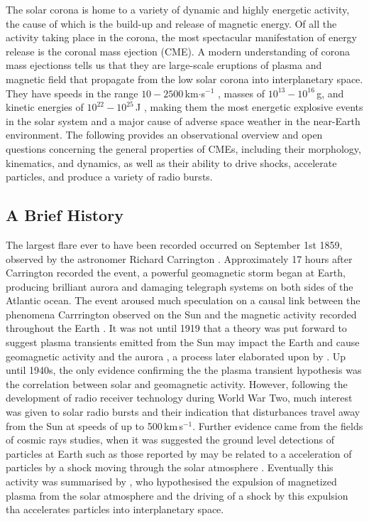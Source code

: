 The solar corona is home to a variety of dynamic and highly energetic activity, the cause of which is the build-up and release of magnetic energy. Of all the activity taking place in the corona, the most spectacular manifestation of energy release is the coronal mass ejection (CME). A modern understanding of corona mass ejectionss tells us that they are large-scale eruptions of plasma and magnetic field that propagate from the low solar corona into interplanetary space. They have speeds in the range $10-2500$\,km$\cdot$s$^{-1}$ \citep{gopal2004}, masses of $10^{13}-10^{16}$\,g, and kinetic energies of $10^{22} - 10^{25}$\,J \citep{vour2010}, making them the most energetic explosive events in the solar system and a major cause of adverse space weather in the near-Earth environment. The following provides an observational overview and open questions concerning the general properties of CMEs, including their morphology, kinematics, and dynamics, as well as their ability to drive shocks, accelerate particles, and produce a variety of radio bursts.

\subsection{A Brief History}\label{sec:20}

The largest flare ever to have been recorded occurred on September 1st 1859, observed by the astronomer Richard Carrington \citep{carrington1859}. Approximately 17 hours after Carrington recorded the event, a powerful geomagnetic storm began at Earth, producing brilliant aurora and damaging telegraph systems on both sides of the Atlantic ocean. The event aroused much speculation on a causal link between the phenomena Carrrington observed on the Sun and the magnetic activity recorded throughout the Earth \citep{balfour1861}. It was not until 1919 that a theory was put forward to suggest plasma transients emitted from the Sun may impact the Earth and cause geomagnetic activity and the aurora \citet{lindemann1919}, a process later elaborated upon by \citet{chapman1930}. Up until 1940s, the only evidence confirming the the plasma transient hypothesis was the correlation between solar and geomagnetic activity. However, following the development of radio receiver technology during World War Two, much interest was given to solar radio bursts and their indication that disturbances travel away from the Sun at speeds of up to 500\,km\,s$^{-1}$\citep{wild1958}. Further evidence came from the fields of cosmic rays studies, when it was suggested the ground level detections of particles at Earth such as those reported by \citep{forbush1946} may be related to a acceleration of particles by a shock moving through the solar atmosphere \citep{wild1963}. Eventually this activity was summarised by \citet{gold1962}, who hypothesised the expulsion of magnetized plasma from the solar atmosphere and the driving of a shock by this expulsion tha accelerates particles into interplanetary space. 

